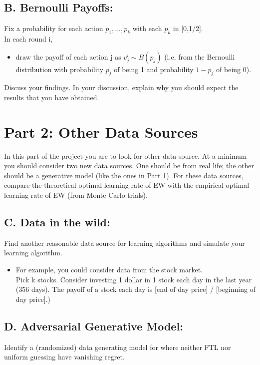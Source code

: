 \documentclass[11pt]{article}
\begin{document}
\vspace{1em}
\subsection*{B. Bernoulli Payoffs:}
Fix a probability for each action $p_{1},...,p_{k}$ with each $p_{k}$ in [0,1/2].\\
In each round i,
\begin{itemize}
    \item draw the payoff of each action j as $v^{i}_{j} \sim B(p_{j})$ (i.e, from the Bernoulli distribution with probability $p_j$ of being 1 and probability $1-p_{j}$ of being 0).
\end{itemize}
Discuss your findings.  In your discussion, explain why you should expect the results that you have obtained.  

\section*{Part 2: Other Data Sources}
In this part of the project you are to look for other data source.  At a minimum you should consider two new data sources.  One should be from real life; the other should be a generative model (like the ones in Part 1).  For these data sources, compare the theoretical optimal learning rate of EW with the empirical optimal learning rate of EW (from Monte Carlo trials).

\vspace{1em}
\subsection*{C. Data in the wild:}Find another reasonable data source for learning algorithms and simulate your learning algorithm.  
\begin{itemize}
    \item For example, you could consider data from the stock market. \\
    Pick k stocks.  Consider investing 1 dollar in 1 stock each day in the last year (356 days). The payoff of a stock each day is [end of day price] / [beginning of day price].)  
\end{itemize}


\vspace{1em}
\subsection*{D. Adversarial Generative Model:}Identify a (randomized) data generating model for where neither FTL nor uniform guessing have vanishing regret. 
\end{document}
